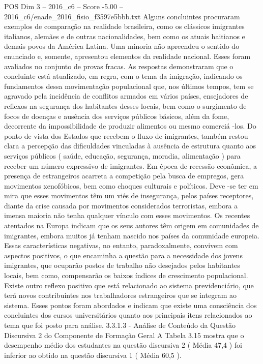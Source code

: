 \begin{textsample}{POS Dim 3 – 2016\_c6 – Score -5.00 – 2016\_c6/enade\_2016\_fisio\_f3597e5bbb.txt}
Alguns concluintes procuraram exemplos de comparação na realidade brasileira, como os clássicos imigrantes italianos, alemães e de outras nacionalidades, bem como os atuais haitianos e demais povos da América Latina.
Uma minoria não apreendeu o sentido do enunciado e, somente, apresentou elementos da realidade nacional.
Esses foram avaliados no conjunto de provas fracas.
As respostas demonstraram que o concluinte está atualizado, em regra, com o tema da imigração, indicando os fundamentos dessa movimentação populacional que, nos últimos tempos, tem se agravado pela incidência de conflitos armados em vários países, ensejadores de reflexos na segurança dos habitantes desses locais, bem como o surgimento de focos de doenças e ausência dos serviços públicos básicos, além da fome, decorrente da impossibilidade de produzir alimentos ou mesmo comerciá -los.
Do ponto de vista dos Estados que recebem o fluxo de imigrantes, também restou clara a percepção das dificuldades vinculadas à ausência de estrutura quanto aos serviços públicos ( saúde, educação, segurança, moradia, alimentação ) para receber um número expressivo de imigrantes.
Em época de recessão econômica, a presença de estrangeiros acarreta a competição pela busca de empregos, gera movimentos xenofóbicos, bem como choques culturais e políticos.
Deve -se ter em mira que esses movimentos têm um viés de insegurança, pelos países receptores, diante da crise causada por movimentos considerados terroristas, embora a imensa maioria não tenha qualquer vínculo com esses movimentos.
Os recentes atentados na Europa indicam que os seus autores têm origem em comunidades de imigrantes, embora muitos já tenham nascido nos países da comunidade europeia.
Essas características negativas, no entanto, paradoxalmente, convivem com aspectos positivos, o que encaminha a questão para a necessidade dos jovens imigrantes, que ocuparão postos de trabalho não desejados pelos habitantes locais, bem como, compensarão os baixos índices de crescimento populacional.
Existe outro reflexo positivo que está relacionado ao sistema previdenciário, que terá novos contribuintes nos trabalhadores estrangeiros que se integram ao sistema.
Esses pontos foram abordados e indicam que existe uma consciência dos concluintes dos cursos universitários quanto aos principais itens relacionados ao tema que foi posto para análise. 3.3.1.3 - Análise de Conteúdo da Questão Discursiva 2 do Componente de Formação Geral A Tabela 3.15 mostra que o desempenho médio dos estudantes na questão discursiva 2 ( Média 47,4 ) foi inferior ao obtido na questão discursiva 1 ( Média 60,5 ).

\end{textsample}
